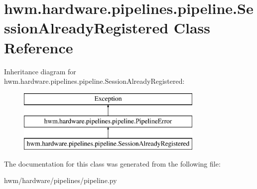 \hypertarget{classhwm_1_1hardware_1_1pipelines_1_1pipeline_1_1_session_already_registered}{\section{hwm.\-hardware.\-pipelines.\-pipeline.\-Session\-Already\-Registered Class Reference}
\label{classhwm_1_1hardware_1_1pipelines_1_1pipeline_1_1_session_already_registered}
}
Inheritance diagram for hwm.\-hardware.\-pipelines.\-pipeline.\-Session\-Already\-Registered\-:\begin{figure}[H]
\begin{center}
\leavevmode
\includegraphics[height=3.000000cm]{classhwm_1_1hardware_1_1pipelines_1_1pipeline_1_1_session_already_registered}
\end{center}
\end{figure}


The documentation for this class was generated from the following file\-:\begin{DoxyCompactItemize}
\item 
hwm/hardware/pipelines/pipeline.\-py\end{DoxyCompactItemize}
